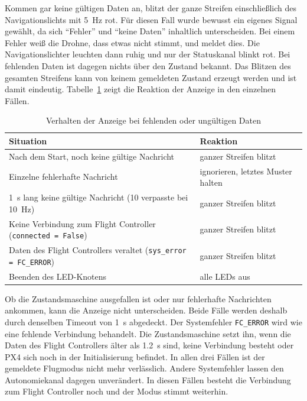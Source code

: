             Kommen gar keine gültigen Daten an, blitzt der ganze Streifen einschließlich des Navigationslichts mit \SI{5}{\hertz} rot. Für diesen Fall wurde bewusst ein eigenes Signal gewählt, da sich \enquote{Fehler} und \enquote{keine Daten} inhaltlich unterscheiden. Bei einem Fehler weiß die Drohne, dass etwas nicht stimmt, und meldet dies. Die Navigationslichter leuchten dann ruhig und nur der Statuskanal blinkt rot. Bei fehlenden Daten ist dagegen nichts über den Zustand bekannt. Das Blitzen des gesamten Streifens kann von keinem gemeldeten Zustand erzeugt werden und ist damit eindeutig. Tabelle~\ref{tab:LED_Fehlerfall} zeigt die Reaktion der Anzeige in den einzelnen Fällen.

            \begin{table}[H]
                \centering
                \caption{Verhalten der Anzeige bei fehlenden oder ungültigen Daten}
                \label{tab:LED_Fehlerfall}
                \begin{tabularx}{\textwidth}{X l}
                    \toprule
                    \textbf{Situation} & \textbf{Reaktion} \\
                    \midrule
                    Nach dem Start, noch keine gültige Nachricht & ganzer Streifen blitzt \\
                    Einzelne fehlerhafte Nachricht & ignorieren, letztes Muster halten \\
                    \SI{1}{\second} lang keine gültige Nachricht (10 verpasste bei \SI{10}{\hertz}) & ganzer Streifen blitzt \\
                    Keine Verbindung zum Flight Controller (\texttt{connected = False}) & ganzer Streifen blitzt \\
                    Daten des Flight Controllers veraltet (\texttt{sys\_error = FC\_ERROR}) & ganzer Streifen blitzt \\
                    Beenden des LED-Knotens & alle LEDs aus \\
                    \bottomrule
                \end{tabularx}
            \end{table}

            Ob die Zustandsmaschine ausgefallen ist oder nur fehlerhafte Nachrichten ankommen, kann die Anzeige nicht unterscheiden. Beide Fälle werden deshalb durch denselben Timeout von \SI{1}{\second} abgedeckt. Der Systemfehler \texttt{FC\_ERROR} wird wie eine fehlende Verbindung behandelt. Die Zustandsmaschine setzt ihn, wenn die Daten des Flight Controllers älter als \SI{1,2}{\second} sind, keine Verbindung besteht oder PX4 sich noch in der Initialisierung befindet. In allen drei Fällen ist der gemeldete Flugmodus nicht mehr verlässlich. Andere Systemfehler lassen den Autonomiekanal dagegen unverändert. In diesen Fällen besteht die Verbindung zum Flight Controller noch und der Modus stimmt weiterhin.

